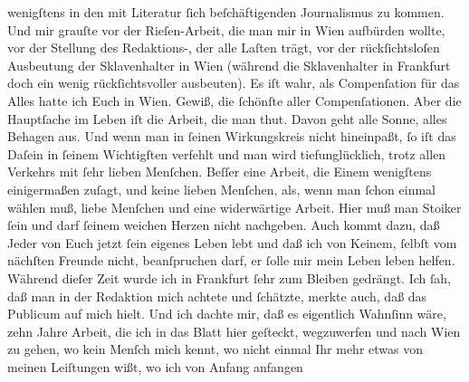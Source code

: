 \begin{ledgroupsized}[t]{13cm}
               wenigſtens in den mit Literatur ſich beſchäftigenden Journalismus zu kommen. Und mir
               grauſte vor der Rieſen-Arbeit, die man mir in Wien
               aufbürden wollte, vor der Stellung des Redaktions-\label{K_L02868-5v}\label{K_L02868-5h}, der alle Laſten
               trägt, vor der rückſichtsloſen Ausbeutung der Sklavenhalter in Wien (während die Sklavenhalter in Frankfurt doch ein wenig  rückſichtsvoller ausbeuten). Es iſt wahr, als Compenſation für das Alles hatte
               ich Euch in Wien.  Gewiß, die ſchönſte aller Compenſationen. Aber  die Hauptſache im Leben iſt die Arbeit, die man thut. Davon geht alle
               Sonne, alles Behagen aus. Und wenn man in ſeinen Wirkungskreis nicht hineinpaßt, ſo
               iſt das Daſein in ſeinem Wichtigſten verfehlt und man wird tiefunglücklich, trotz
               allen Verkehrs {\pb}mit ſehr lieben Menſchen. Beſſer
               eine Arbeit, die Einem wenigſtens einigermaßen zuſagt, und keine lieben Menſchen,
               als, wenn man ſchon einmal wählen muß, liebe Menſchen und eine widerwärtige Arbeit.
                  \introOben{}Hier muß man Stoiker ſein und darf ſeinem weichen Herzen nicht
                  nachgeben.\introOben{} Auch kommt dazu, daß Jeder von Euch jetzt ſein eigenes Leben lebt
               und daß ich von \strikeout{\textcolor{gray}{K}} Keinem, ſelbſt vom nächſten Freunde nicht, beanſpruchen darf, er ſolle mir
               mein Leben leben helfen. Während dieſer Zeit wurde ich in Frankfurt ſehr zum Bleiben gedrängt. Ich ſah, daß  man in der Redaktion mich achtete und ſchätzte, merkte auch, daß das
               Publicum auf mich hielt. Und ich dachte mir, daß es eigentlich Wahnſinn wäre, zehn
               Jahre Arbeit, die ich in das Blatt hier geſteckt, wegzuwerfen\strikeout{,} und nach
                  Wien zu gehen, wo kein Menſch mich kennt, wo
               nicht einmal Ihr mehr etwas von meinen Leiſtungen wißt, wo ich von Anfang anfangen

\end{ledgroupsized}
